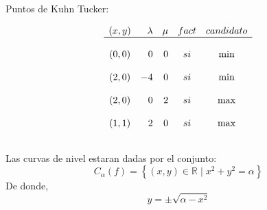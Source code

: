\begin{enumerate}
\begin{itemize}
\begin{itemize}
		\end{itemize}

	\end{itemize}

	Puntos de Kuhn Tucker:

	$$
	\begin{array}{*{5}{crrcc}}
	    (x,y) & \lambda & \mu & fact & candidato\\
	    \hline\\
	    (0,0)&0&0&si&\min\\\\
	    (2,0)&-4&0&si&\min\\\\
	    (2,0)&0&2&si&\max\\\\
	    (1,1)&2&0&si&\max\\\\

	\end{array}
	$$

	Las curvas de nivel estaran dadas por el conjunto:
	$$C_\alpha (f) = \left\{ (x,y) \in \mathbb{R} \; | \; x^2+y^2=\alpha \right\}$$
	De donde,
	$$y=\pm\sqrt{\alpha -x^2}$$


\end{enumerate}
